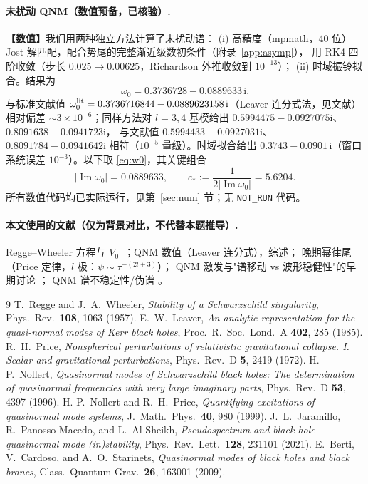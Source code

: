 \documentclass[11pt]{ctexart}
\theoremstyle{definition}
\newcommand{\ii}{\mathrm{i}}
\newcommand{\Imw}{\operatorname{Im}\omega}
\begin{document}
\paragraph{未扰动 QNM（数值预备，已核验）.}
\textbf{【数值】}我们用两种独立方法计算了未扰动谱：
(i) 高精度（mpmath，40 位）Jost 解匹配，配合势尾的完整渐近级数初条件（附录~\ref{app:asymp}），
用 RK4 四阶收敛（步长 $0.025\to0.00625$，Richardson 外推收敛到 $10^{-13}$）；
(ii) 时域振铃拟合。结果为
\begin{equation}
\omega_0=0.3736728-0.0889633\,\ii .
\label{eq:w0}
\end{equation}
与标准文献值 $\omega_0^{\rm lit}=0.3736716844-0.0889623158\,\ii$（Leaver 连分式法，见文献\cite{Leaver1985,Berti2009}）
相对偏差 $\sim3\times10^{-6}$；同样方法对 $l=3,4$ 基模给出 $0.5994475-0.0927075\ii$、$0.8091638-0.0941723\ii$，
与文献值 $0.5994433-0.0927031\ii$、$0.8091784-0.0941642\ii$ 相符（$10^{-5}$ 量级）。时域拟合给出
$0.3743-0.0901\,\ii$（窗口系统误差 $10^{-3}$）。以下取 \eqref{eq:w0}，其关键组合
\begin{equation}
|\Imw_0|=0.0889633,\qquad c_*:=\frac1{2|\Imw_0|}=5.6204 .
\label{eq:cstar}
\end{equation}
所有数值代码均已实际运行，见第~\ref{sec:num} 节；无 \texttt{NOT\_RUN} 代码。

\paragraph{本文使用的文献（仅为背景对比，不代替本题推导）.}
Regge--Wheeler 方程与 $V_0$\ \cite{ReggeWheeler1957}；QNM 数值（Leaver 连分式）\cite{Leaver1985}，综述\cite{Berti2009}；
晚期幂律尾（Price 定律，$l$ 极：$\psi\sim\tau^{-(2l+3)}$）\cite{Price1972}；
QNM 激发与"谱移动 vs 波形稳健性"的早期讨论 \cite{Nollert1996,NollertPrice1999}；
QNM 谱不稳定性/伪谱 \cite{Jaramillo2021}。






\begin{thebibliography}{9}
 T.~Regge and J.~A.~Wheeler, \emph{Stability of a Schwarzschild singularity},
Phys.\ Rev.\ \textbf{108}, 1063 (1957).
 E.~W.~Leaver, \emph{An analytic representation for the quasi-normal modes of Kerr
black holes}, Proc.\ R.\ Soc.\ Lond.\ A \textbf{402}, 285 (1985).
 R.~H.~Price, \emph{Nonspherical perturbations of relativistic gravitational collapse.
I. Scalar and gravitational perturbations}, Phys.\ Rev.\ D \textbf{5}, 2419 (1972).
 H.-P.~Nollert, \emph{Quasinormal modes of Schwarzschild black holes: The determination
of quasinormal frequencies with very large imaginary parts}, Phys.\ Rev.\ D \textbf{53}, 4397 (1996).
 H.-P.~Nollert and R.~H.~Price, \emph{Quantifying excitations of quasinormal mode
systems}, J.\ Math.\ Phys.\ \textbf{40}, 980 (1999).
 J.~L.~Jaramillo, R.~Panosso Macedo, and L.~Al Sheikh,
\emph{Pseudospectrum and black hole quasinormal mode (in)stability},
Phys.\ Rev.\ Lett.\ \textbf{128}, 231101 (2021).
 E.~Berti, V.~Cardoso, and A.~O.~Starinets,
\emph{Quasinormal modes of black holes and black branes}, Class.\ Quantum Grav.\ \textbf{26}, 163001 (2009).
\end{thebibliography}
\end{document}
